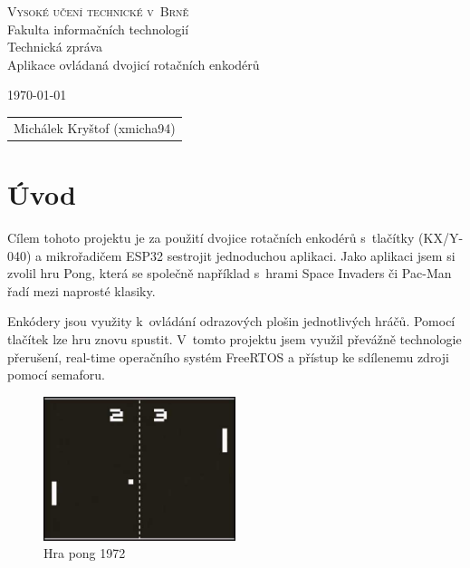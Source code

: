 \documentclass[a4paper,11pt]{article}
\begin{document}
\begin{center}
\Huge
\textsc{Vysoké učení technické v~Brně\\
}Fakulta informačních technologií\\
\Huge Technická zpráva \\
\LARGE  Aplikace ovládaná dvojicí rotačních enkodérů \\

\Large 


\end{center}
{\Large \today \hfill
\begin{tabular}{l}
            Michálek Kryštof (xmicha94)
\end{tabular}}
\thispagestyle{empty}

\newpage
\tableofcontents
\newpage

\section{Úvod}
Cílem tohoto projektu je za použití dvojice rotačních enkodérů s~tlačítky (KX/Y-040) a mikrořadičem ESP32 sestrojit jednoduchou aplikaci. 
Jako aplikaci jsem si zvolil hru Pong, která se společně například s~hrami Space Invaders či Pac-Man řadí mezi naprosté klasiky. 

Enkódery jsou využity k~ovládání odrazových plošin jednotlivých hráčů. 
Pomocí tlačítek lze hru znovu spustit. 
V~tomto projektu jsem využil převážně technologie přerušení, real-time operačního systém FreeRTOS a přístup ke sdílenemu zdroji pomocí semaforu.

\begin{figure}[H]
    \centering
    \includegraphics[width=0.5\textwidth]{obrazky-figures/pong.jpg}
    \caption{Hra pong 1972}
\end{figure}
\end{document}
